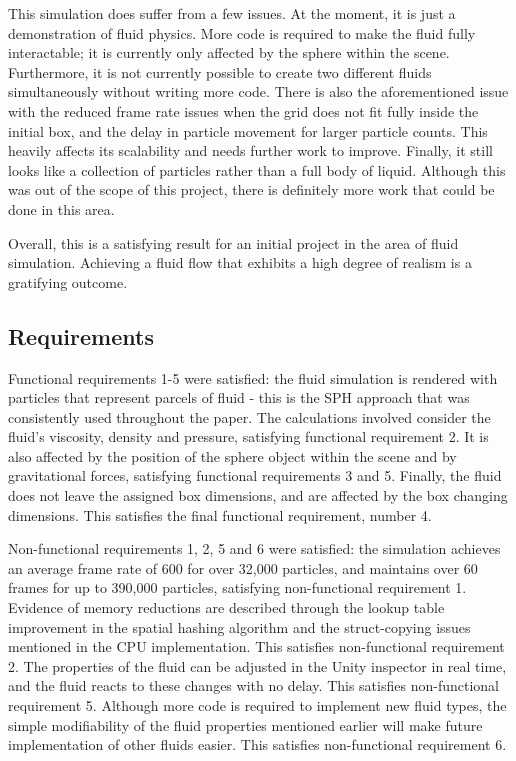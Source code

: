 \documentclass[a4paper, 12pt]{article}
\begin{document}
    This simulation does suffer from a few issues. At the moment, it is just a demonstration of fluid physics. More code is required to make the fluid fully interactable; it is currently only affected by the sphere within the scene. Furthermore, it is not currently possible to create two different fluids simultaneously without writing more code. There is also the aforementioned issue with the reduced frame rate issues when the grid does not fit fully inside the initial box, and the delay in particle movement for larger particle counts. This heavily affects its scalability and needs further work to improve. Finally, it still looks like a collection of particles rather than a full body of liquid. Although this was out of the scope of this project, there is definitely more work that could be done in this area.

    Overall, this is a satisfying result for an initial project in the area of fluid simulation. Achieving a fluid flow that exhibits a high degree of realism is a gratifying outcome.

    \subsection{Requirements}

    Functional requirements 1-5 were satisfied: the fluid simulation is rendered with particles that represent parcels of fluid - this is the SPH approach that was consistently used throughout the paper. The calculations involved consider the fluid's viscosity, density and pressure, satisfying functional requirement 2. It is also affected by the position of the sphere object within the scene and by gravitational forces, satisfying functional requirements 3 and 5. Finally, the fluid does not leave the assigned box dimensions, and are affected by the box changing dimensions. This satisfies the final functional requirement, number 4.

    Non-functional requirements 1, 2, 5 and 6 were satisfied: the simulation achieves an average frame rate of 600 for over 32,000 particles, and maintains over 60 frames for up to 390,000 particles, satisfying non-functional requirement 1. Evidence of memory reductions are described through the lookup table improvement in the spatial hashing algorithm and the struct-copying issues mentioned in the CPU implementation. This satisfies non-functional requirement 2. The properties of the fluid can be adjusted in the Unity inspector in real time, and the fluid reacts to these changes with no delay. This satisfies non-functional requirement 5. Although more code is required to implement new fluid types, the simple modifiability of the fluid properties mentioned earlier will make future implementation of other fluids easier. This satisfies non-functional requirement 6.
\end{document}
